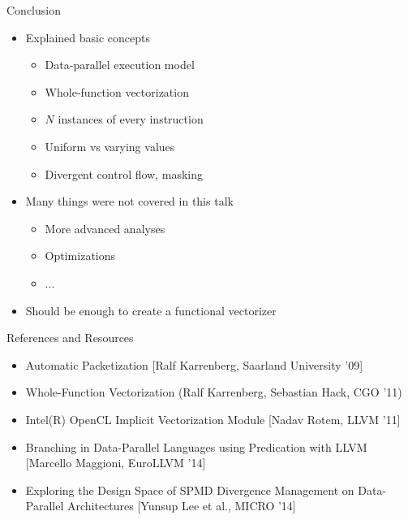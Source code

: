 \documentclass[t,aspectratio=169]{beamer}
\newcommand{\codeempha}[1]{\textcolor{uipink}{#1}}
\newcommand{\codeemphb}[1]{\textcolor{uicyan}{#1}}
\newcommand{\varying}[1]{\codeempha{#1}}
\newcommand{\uniform}[1]{\codeemphb{#1}}
\begin{document}
\begin{frame}{Conclusion}

\begin{itemize}
    \item Explained basic concepts
    \begin{itemize}
        \item Data-parallel execution model
        \item Whole-function vectorization
        \item $N$ instances of every instruction
        \item \uniform{Uniform} vs \varying{varying} values
        \item \varying{Divergent} control flow, masking
    \end{itemize}
    \item Many things were not covered in this talk
    \begin{itemize}
        \item More advanced analyses
        \item Optimizations
        \item ...
    \end{itemize}
    \item Should be enough to create a functional vectorizer
\end{itemize}

\end{frame}


\begin{frame}{References and Resources}

\begin{itemize}
    \item Automatic Packetization [Ralf Karrenberg, Saarland University '09]
    \item Whole-Function Vectorization (Ralf Karrenberg, Sebastian Hack, CGO '11)
    \item Intel(R) OpenCL Implicit Vectorization Module [Nadav Rotem, LLVM '11]
    \item Branching in Data-Parallel Languages using Predication with LLVM [Marcello Maggioni, EuroLLVM '14]
    \item Exploring the Design Space of SPMD Divergence Management on Data-Parallel Architectures [Yunsup Lee et al., MICRO '14]
\end{itemize}

\end{frame}
\end{document}
